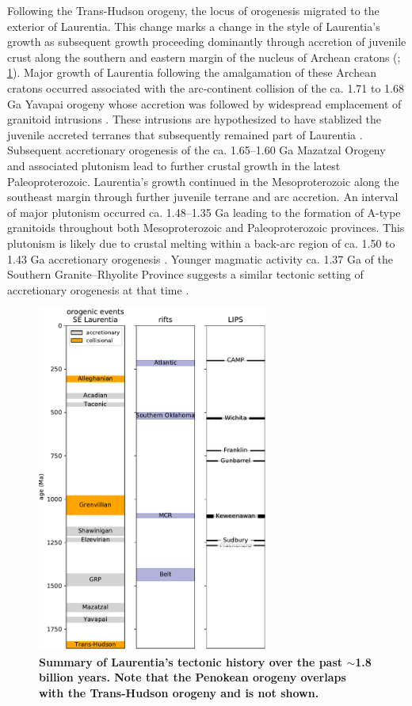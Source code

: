 \documentclass[11pt,letterpaper]{article}
\begin{document}
Following the Trans-Hudson orogeny, the locus of orogenesis migrated to the exterior of Laurentia. This change marks a change in the style of Laurentia's growth as subsequent growth proceeding dominantly through accretion of juvenile crust along the southern and eastern margin of the nucleus of Archean cratons (\citealp{Whitmeyer2007a}; \ref{fig:Laurentia_map}). Major growth of Laurentia following the amalgamation of these Archean cratons occurred associated with the arc-continent collision of the ca. 1.71 to 1.68 Ga Yavapai orogeny whose accretion was followed by widespread emplacement of granitoid intrusions \citep{Whitmeyer2007a}. These intrusions are hypothesized to have stablized the juvenile accreted terranes that subsequently remained part of Laurentia \citep{Whitmeyer2007a}. Subsequent accretionary orogenesis of the ca. 1.65–1.60 Ga Mazatzal Orogeny and associated plutonism lead to further crustal growth in the latest Paleoproterozoic. Laurentia's growth continued in the Mesoproterozoic along the southeast margin through further juvenile terrane and arc accretion. An interval of major plutonism occurred ca. 1.48–1.35 Ga leading to the formation of A-type granitoids throughout both Mesoproterozoic and Paleoproterozoic provinces. This plutonism is likely due to crustal melting within a back-arc region of ca. 1.50 to 1.43 Ga accretionary orogenesis \citep{Bickford2015a}. Younger magmatic activity ca. 1.37 Ga  of the Southern Granite–Rhyolite Province suggests a similar tectonic setting of accretionary orogenesis at that time \citep{Bickford2015a}. 

\begin{figure}
\centering
\includegraphics[width=3in]{Figures/Tectonic_history.pdf}
\caption{\small{\textbf{Summary of Laurentia's tectonic history over the past $\sim$1.8 billion years. Note that the Penokean orogeny overlaps with the Trans-Hudson orogeny and is not shown.}}}
\label{fig:Laurentia_map}
\end{figure}
\end{document}
